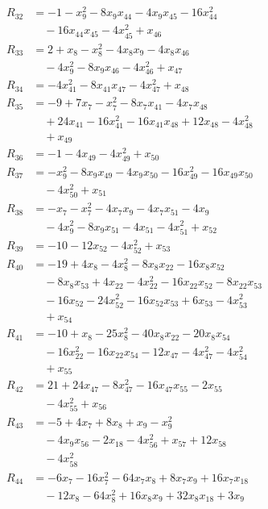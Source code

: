 \begin{align*}
R_{32} &= -1 -x_{9}^{2} -8x_{9}x_{44} -4x_{9}x_{45} -16x_{44}^{2}\\
&\quad -16x_{44}x_{45} -4x_{45}^{2} +x_{46}\\
R_{33} &= 2 +x_{8} -x_{8}^{2} -4x_{8}x_{9} -4x_{8}x_{46}\\
&\quad -4x_{9}^{2} -8x_{9}x_{46} -4x_{46}^{2} +x_{47}\\
R_{34} &= -4x_{41}^{2} -8x_{41}x_{47} -4x_{47}^{2} +x_{48}\\
R_{35} &= -9 +7x_{7} -x_{7}^{2} -8x_{7}x_{41} -4x_{7}x_{48}\\
&\quad +24x_{41} -16x_{41}^{2} -16x_{41}x_{48} +12x_{48} -4x_{48}^{2}\\
&\quad +x_{49}\\
R_{36} &= -1 -4x_{49} -4x_{49}^{2} +x_{50}\\
R_{37} &= -x_{9}^{2} -8x_{9}x_{49} -4x_{9}x_{50} -16x_{49}^{2} -16x_{49}x_{50}\\
&\quad -4x_{50}^{2} +x_{51}\\
R_{38} &= -x_{7} -x_{7}^{2} -4x_{7}x_{9} -4x_{7}x_{51} -4x_{9}\\
&\quad -4x_{9}^{2} -8x_{9}x_{51} -4x_{51} -4x_{51}^{2} +x_{52}\\
R_{39} &= -10 -12x_{52} -4x_{52}^{2} +x_{53}\\
R_{40} &= -19 +4x_{8} -4x_{8}^{2} -8x_{8}x_{22} -16x_{8}x_{52}\\
&\quad -8x_{8}x_{53} +4x_{22} -4x_{22}^{2} -16x_{22}x_{52} -8x_{22}x_{53}\\
&\quad -16x_{52} -24x_{52}^{2} -16x_{52}x_{53} +6x_{53} -4x_{53}^{2}\\
&\quad +x_{54}\\
R_{41} &= -10 +x_{8} -25x_{8}^{2} -40x_{8}x_{22} -20x_{8}x_{54}\\
&\quad -16x_{22}^{2} -16x_{22}x_{54} -12x_{47} -4x_{47}^{2} -4x_{54}^{2}\\
&\quad +x_{55}\\
R_{42} &= 21 +24x_{47} -8x_{47}^{2} -16x_{47}x_{55} -2x_{55}\\
&\quad -4x_{55}^{2} +x_{56}\\
R_{43} &= -5 +4x_{7} +8x_{8} +x_{9} -x_{9}^{2}\\
&\quad -4x_{9}x_{56} -2x_{18} -4x_{56}^{2} +x_{57} +12x_{58}\\
&\quad -4x_{58}^{2}\\
R_{44} &= -6x_{7} -16x_{7}^{2} -64x_{7}x_{8} +8x_{7}x_{9} +16x_{7}x_{18}\\
&\quad -12x_{8} -64x_{8}^{2} +16x_{8}x_{9} +32x_{8}x_{18} +3x_{9}\\

\end{align*}
